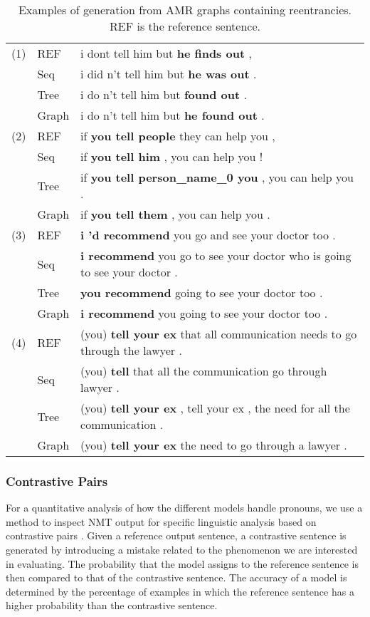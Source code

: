 \documentclass[11pt,a4paper]{article}
\begin{document}
\begin{table*}
\centering
\begin{tabular}{lll}
\toprule
(1)
& {\sc REF} & i dont tell him but \textbf{he finds out} ,\\
& {\sc Seq} & i did n't tell him but \textbf{he was out} .\\
& {\sc Tree} & i do n't tell him but \textbf{found out} .\\
& {\sc Graph} & i do n't tell him but \textbf{he found out} .\\
\midrule
(2)
& {\sc REF} & if \textbf{you tell people} they can help you ,\\
& {\sc Seq} & if \textbf{you tell him} , you can help you !\\
& {\sc Tree} & if \textbf{you tell person\_name\_0 you} , you can help you .\\
& {\sc Graph} & if \textbf{you tell them} , you can help you .\\
\midrule
(3)
& {\sc REF} & \textbf{i 'd recommend} you go and see your doctor too .\\
& {\sc Seq} & \textbf{i recommend} you go to see your doctor who is going to see your doctor .\\
& {\sc Tree} & \textbf{you recommend} going to see your doctor too .\\
& {\sc Graph} & \textbf{i recommend} you going to see your doctor too .\\
\midrule
(4) 
& {\sc REF} & (you) \textbf{tell your ex} that all communication needs to go through the lawyer .\\
& {\sc Seq} & (you) \textbf{tell} that all the communication go through lawyer .\\
& {\sc Tree} & (you) \textbf{tell your ex} , tell your ex , the need for all the communication .\\
& {\sc Graph} & (you) \textbf{tell your ex} the need to go through a lawyer .\\
\bottomrule
\end{tabular}
\caption{Examples of generation from AMR graphs containing reentrancies. {\sc REF} is the reference sentence.}
\label{tab:example_reentrancies}
\end{table*}


\subsubsection{Contrastive Pairs}

For a quantitative analysis of how the different models handle pronouns, we use a method to inspect NMT output for specific linguistic analysis based on contrastive pairs \cite{sennrich2017grammatical}. Given a reference output sentence, a contrastive sentence is generated by introducing a mistake related to the phenomenon we are interested in evaluating. The probability that the model assigns to the reference sentence is then compared to that of the contrastive sentence. The accuracy of a model is determined by the percentage of examples in which the reference sentence has a higher probability than the contrastive sentence. 
\end{document}
